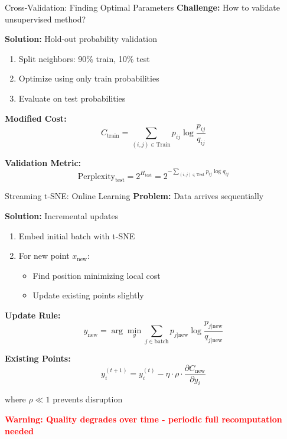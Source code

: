 \documentclass[aspectratio=169]{beamer}
\newcommand{\conceptbox}[2]{\colorbox{#1!20}{\textcolor{#1}{\textbf{#2}}}}
\newcommand{\warning}[1]{\conceptbox{red}{Warning: #1}}
\begin{document}
\begin{frame}{Cross-Validation: Finding Optimal Parameters}
\textbf{Challenge:} How to validate unsupervised method?

\textbf{Solution:} Hold-out probability validation
\begin{enumerate}
\item Split neighbors: 90\% train, 10\% test
\item Optimize using only train probabilities
\item Evaluate on test probabilities
\end{enumerate}

\textbf{Modified Cost:}
$$C_{\text{train}} = \sum_{(i,j) \in \text{Train}} p_{ij} \log \frac{p_{ij}}{q_{ij}}$$

\textbf{Validation Metric:}
$$\text{Perplexity}_{\text{test}} = 2^{H_{\text{test}}} = 2^{-\sum_{(i,j) \in \text{Test}} p_{ij} \log q_{ij}}$$

\begin{center}
\end{center}
\end{frame}

\begin{frame}{Streaming t-SNE: Online Learning}
\textbf{Problem:} Data arrives sequentially

\textbf{Solution:} Incremental updates
\begin{enumerate}
\item Embed initial batch with t-SNE
\item For new point $x_{\text{new}}$:
    \begin{itemize}
    \item Find position minimizing local cost
    \item Update existing points slightly
    \end{itemize}
\end{enumerate}

\textbf{Update Rule:}
$$y_{\text{new}} = \arg\min_y \sum_{j \in \text{batch}} p_{j|\text{new}} \log \frac{p_{j|\text{new}}}{q_{j|\text{new}}}$$

\textbf{Existing Points:}
$$y_i^{(t+1)} = y_i^{(t)} - \eta \cdot \rho \cdot \frac{\partial C_{\text{new}}}{\partial y_i}$$

where $\rho \ll 1$ prevents disruption

\warning{Quality degrades over time - periodic full recomputation needed}
\end{frame}
\end{document}

